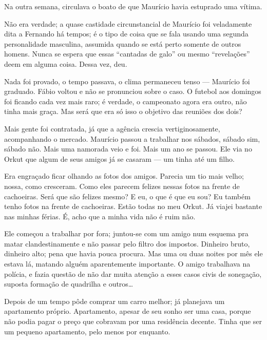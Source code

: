 Na outra semana, circulava o boato de que Maurício havia estuprado uma vítima.

\begin{sloppypar}
Não era verdade; a quase castidade circunstancial de Maurício foi veladamente dita a Fernando há tempos; é o tipo de coisa que se fala usando uma segunda personalidade masculina, assumida quando se está perto somente de outros homens. Nunca se espera que essas ``cantadas de galo'' ou mesmo ``revelações'' deem em alguma coisa. Dessa vez, deu.
\end{sloppypar}

Nada foi provado, o tempo passava, o clima permaneceu tenso --- Maurício foi graduado. Fábio voltou e não se pronunciou sobre o caso. O futebol aos domingos foi ficando cada vez mais raro; é verdade, o campeonato agora era outro, não tinha mais graça. Mas será que era só isso o objetivo das reuniões dos dois?

Mais gente foi contratada, já que a agência crescia vertiginosamente, acompanhando o mercado. Maurício passou a trabalhar nos sábados, sábado sim, sábado não. Mais uma namorada veio e foi. Mais um ano se passou. Ele via no Orkut que algum de seus amigos já se casaram --- um tinha até um filho.

Era engraçado ficar olhando as fotos dos amigos. Parecia um tio mais velho; nossa, como cresceram. Como eles parecem felizes nessas fotos na frente de cachoeiras. Será que são felizes mesmo? E eu, o que é que eu sou? Eu também tenho fotos na frente de cachoeiras. Estão todas no meu Orkut. Já viajei bastante nas minhas férias. É, acho que a minha vida não é ruim não.

\begin{sloppypar}
Ele começou a trabalhar por fora; juntou-se com um amigo num esquema pra matar clandestinamente e não passar pelo filtro dos impostos. Dinheiro bruto, dinheiro alto; pena que havia pouca procura. Mas uma ou duas noites por mês ele estava lá, matando alguém aparentemente importante. O amigo trabalhava na polícia, e fazia questão de não dar muita atenção a esses casos civis de sonegação, suposta formação de quadrilha e outros\ldots\,
\end{sloppypar}

Depois de um tempo pôde comprar um carro melhor; já planejava um apartamento próprio. Apartamento, apesar de seu sonho ser uma casa, porque não podia pagar o preço que cobravam por uma residência decente. Tinha que ser um pequeno apartamento, pelo menos por enquanto.

